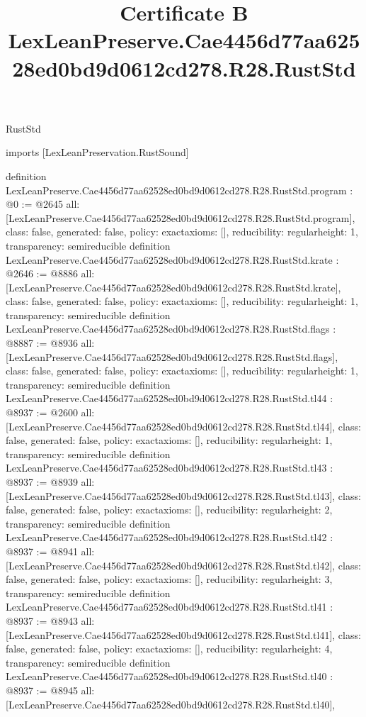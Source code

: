 \begin{lexlean}{RustStd}
\title{Certificate B LexLeanPreserve.Cae4456d77aa62528ed0bd9d0612cd278.R28.RustStd}
\begin{coremodule}
imports [LexLeanPreservation.RustSound]

definition LexLeanPreserve.Cae4456d77aa62528ed0bd9d0612cd278.R28.RustStd.program : @0 := @2645 {
  all: [LexLeanPreserve.Cae4456d77aa62528ed0bd9d0612cd278.R28.RustStd.program],
  class: false,
  generated: false,
  policy: exact{axioms: []},
  reducibility: regular{height: 1},
  transparency: semireducible
}
definition LexLeanPreserve.Cae4456d77aa62528ed0bd9d0612cd278.R28.RustStd.krate : @2646 := @8886 {
  all: [LexLeanPreserve.Cae4456d77aa62528ed0bd9d0612cd278.R28.RustStd.krate],
  class: false,
  generated: false,
  policy: exact{axioms: []},
  reducibility: regular{height: 1},
  transparency: semireducible
}
definition LexLeanPreserve.Cae4456d77aa62528ed0bd9d0612cd278.R28.RustStd.flags : @8887 := @8936 {
  all: [LexLeanPreserve.Cae4456d77aa62528ed0bd9d0612cd278.R28.RustStd.flags],
  class: false,
  generated: false,
  policy: exact{axioms: []},
  reducibility: regular{height: 1},
  transparency: semireducible
}
definition LexLeanPreserve.Cae4456d77aa62528ed0bd9d0612cd278.R28.RustStd.tl44 : @8937 := @2600 {
  all: [LexLeanPreserve.Cae4456d77aa62528ed0bd9d0612cd278.R28.RustStd.tl44],
  class: false,
  generated: false,
  policy: exact{axioms: []},
  reducibility: regular{height: 1},
  transparency: semireducible
}
definition LexLeanPreserve.Cae4456d77aa62528ed0bd9d0612cd278.R28.RustStd.tl43 : @8937 := @8939 {
  all: [LexLeanPreserve.Cae4456d77aa62528ed0bd9d0612cd278.R28.RustStd.tl43],
  class: false,
  generated: false,
  policy: exact{axioms: []},
  reducibility: regular{height: 2},
  transparency: semireducible
}
definition LexLeanPreserve.Cae4456d77aa62528ed0bd9d0612cd278.R28.RustStd.tl42 : @8937 := @8941 {
  all: [LexLeanPreserve.Cae4456d77aa62528ed0bd9d0612cd278.R28.RustStd.tl42],
  class: false,
  generated: false,
  policy: exact{axioms: []},
  reducibility: regular{height: 3},
  transparency: semireducible
}
definition LexLeanPreserve.Cae4456d77aa62528ed0bd9d0612cd278.R28.RustStd.tl41 : @8937 := @8943 {
  all: [LexLeanPreserve.Cae4456d77aa62528ed0bd9d0612cd278.R28.RustStd.tl41],
  class: false,
  generated: false,
  policy: exact{axioms: []},
  reducibility: regular{height: 4},
  transparency: semireducible
}
definition LexLeanPreserve.Cae4456d77aa62528ed0bd9d0612cd278.R28.RustStd.tl40 : @8937 := @8945 {
  all: [LexLeanPreserve.Cae4456d77aa62528ed0bd9d0612cd278.R28.RustStd.tl40],
}
\end{coremodule}
\end{lexlean}
